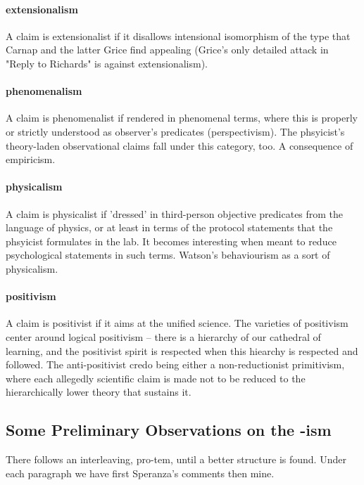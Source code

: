 \documentclass[10pt,titlepage]{book}
\begin{document}
\paragraph{extensionalism} A claim is extensionalist if it disallows intensional  
isomorphism of the type that Carnap and the latter Grice find appealing (Grice's 
 only detailed attack in "Reply to Richards" is against extensionalism).
 
\paragraph{phenomenalism} A claim is phenomenalist if rendered in phenomenal terms,  
where this is properly or strictly understood as observer's predicates  
(perspectivism). The phsyicist's theory-laden observational claims fall under  
this category, too. A consequence of empiricism.
 
\paragraph{physicalism} A claim is physicalist if 'dressed' in third-person objective  
predicates from the language of physics, or at least in terms of the 
protocol  statements that the phsyicist formulates in the lab. It becomes 
interesting when  meant to reduce psychological statements in such terms. Watson's 
behaviourism as  a sort of physicalism.
 
\paragraph{positivism} A claim is positivist if it aims at the unified science. The  
varieties of positivism center around logical positivism -- there is a 
hierarchy  of our cathedral of learning, and the positivist spirit is respected 
when this  hiearchy is respected and followed. The anti-positivist credo being 
either a  non-reductionist primitivism, where each allegedly scientific 
claim is made not  to be reduced to the hierarchically lower theory that 
sustains it.
 
\subsection{Some Preliminary Observations on the -ism}

There follows an interleaving, pro-tem, until a better structure is found.
Under each paragraph we have first Speranza's comments then mine.
\end{document}
